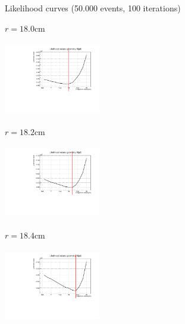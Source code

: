 \documentclass[8 pt]{beamer}
\begin{document}
\begin{frame}{Likelihood curves (50.000 events, 100 iterations)}
\justifying
\begin{minipage}[c]{.32\textwidth}
\begin{exampleblock}{} \begin{center}$r = 18.0$cm\end{center} \end{exampleblock}
\includegraphics[width=4.2cm, height=3.2cm]{figs/likelihood100HighStat/likelihood18p0.pdf} 
\end{minipage}
\begin{minipage}[c]{.32\textwidth}
\begin{exampleblock}{} \begin{center}$r = 18.2$cm\end{center} \end{exampleblock}
\includegraphics[width=4.2cm, height=3.2cm]{figs/likelihood100HighStat/likelihood18p2.pdf} 
\end{minipage}
\begin{minipage}[c]{.32\textwidth}
\begin{exampleblock}{} \begin{center}$r = 18.4$cm\end{center} \end{exampleblock}
\includegraphics[width=4.2cm, height=3.2cm]{figs/likelihood100HighStat/likelihood18p4.pdf} 
\end{minipage}


\end{frame}
\end{document}
